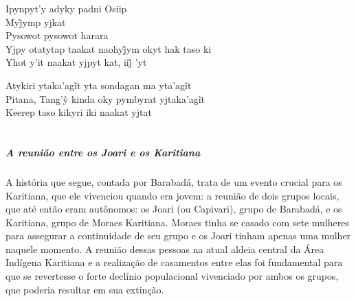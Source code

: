 \bigskip

\begin{linenumbers}\begingroup\raggedright
 
\noindent   Ipynpyt'y adyky padni Osiip\\
  Myj̃ymp yjkat\\
  Pysowot pysowot harara\\
  Yjpy otatytap taakat naohyj̃ym okyt hak taso ki\\
  Yhot y’it naakat yjpyt kat, iij̃ ’yt
 
\end{linenumbers}\endgroup

\bigskip

\begin{linenumbers}\begingroup\raggedright
 
\noindent   Atykiri ytaka’agĩt yta sondagan ma yta’agĩt\\
  Pitana, Tang’ỹ kinda oky pymbyrat yjtaka’agĩt\\
  Keerep taso kikyri iki naakat yjtat
\end{linenumbers}\endgroup

\chapter*{}
\thispagestyle{empty}
\vspace*{\fill}
\paragraph{A reunião entre os Joari e os Karitiana}
A história que segue, contada por Barabadá, trata de um evento crucial para os Karitiana, que ele vivenciou quando era jovem: a reunião de dois grupos locais, que até então eram autônomos: os Joari (ou Capivari), grupo de Barabadá, e os Karitiana, grupo de Moraes Karitiana. Moraes tinha se casado com sete mulheres para assegurar a continuidade de seu grupo e os Joari tinham apenas uma mulher naquele momento. A reunião dessas pessoas na atual aldeia central da Área Indígena Karitiana e a realização de casamentos entre elas foi fundamental para que se revertesse o forte declínio populacional vivenciado por ambos os grupos, que poderia resultar em sua extinção.


